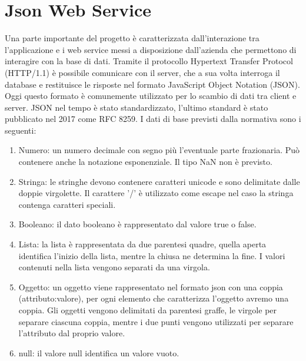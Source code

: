\documentclass[12pt]{report}
\begin{document}
\section{Json Web Service}
Una parte importante del progetto è caratterizzata dall'interazione tra l'applicazione e i web service messi a disposizione dall'azienda che permettono di interagire con la base di dati. Tramite il protocollo Hypertext Transfer Protocol (HTTP/1.1)\cite{http} è possibile comunicare con il server, che a sua volta interroga il database e restituisce le risposte nel formato JavaScript Object Notation (JSON). Oggi questo formato è comunemente utilizzato per lo scambio di dati tra client e server. JSON nel tempo è stato standardizzato, l'ultimo standard è stato pubblicato nel 2017 come RFC 8259\cite{json}. I dati di base previsti dalla normativa sono i seguenti:
	\begin{enumerate}
		\item Numero: un numero decimale con segno più l'eventuale parte frazionaria. Può contenere anche la notazione esponenziale. Il tipo NaN non è previsto.
		\item Stringa: le stringhe devono contenere caratteri unicode e sono delimitate dalle doppie virgolette. Il carattere '/' è utilizzato come escape nel caso la stringa contenga caratteri speciali.
		\item Booleano: il dato booleano è rappresentato dal valore true o false.
		\item Lista: la lista è rappresentata da due parentesi quadre, quella aperta identifica l'inizio della lista, mentre la chiusa ne determina la fine. I valori contenuti nella lista vengono separati da una virgola.
		\item Oggetto: un oggetto viene rappresentato nel formato json con una coppia (attributo:valore), per ogni elemento che caratterizza l'oggetto avremo una coppia. Gli oggetti vengono delimitati da parentesi graffe, le virgole per separare ciascuna coppia, mentre i due punti vengono utilizzati per separare l'attributo dal proprio valore.
		\item null: il valore null identifica un valore vuoto.
	\end{enumerate}
\end{document}

